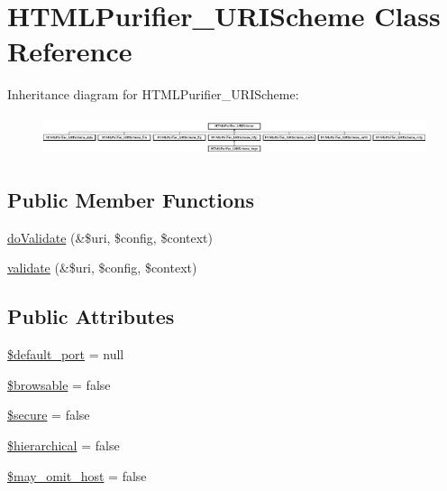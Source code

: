 \hypertarget{classHTMLPurifier__URIScheme}{\section{H\+T\+M\+L\+Purifier\+\_\+\+U\+R\+I\+Scheme Class Reference}
\label{classHTMLPurifier__URIScheme}
}
Inheritance diagram for H\+T\+M\+L\+Purifier\+\_\+\+U\+R\+I\+Scheme\+:\begin{figure}[H]
\begin{center}
\leavevmode
\includegraphics[height=1.165049cm]{classHTMLPurifier__URIScheme}
\end{center}
\end{figure}
\subsection*{Public Member Functions}
\begin{DoxyCompactItemize}
\item 
\hyperlink{classHTMLPurifier__URIScheme_ab915d9b60669d9c79c23472265ded7fd}{do\+Validate} (\&\$uri, \$config, \$context)
\item 
\hyperlink{classHTMLPurifier__URIScheme_af881ccfdd6fc02d661801e401ad3298f}{validate} (\&\$uri, \$config, \$context)
\end{DoxyCompactItemize}
\subsection*{Public Attributes}
\begin{DoxyCompactItemize}
\item 
\hyperlink{classHTMLPurifier__URIScheme_a3a6f27695d6029d4cab45ed2cc20e5ba}{\$default\+\_\+port} = null
\item 
\hyperlink{classHTMLPurifier__URIScheme_abbd36fc30d0256aa9a3a2728a4b1d28f}{\$browsable} = false
\item 
\hyperlink{classHTMLPurifier__URIScheme_a53fc8c93025cf82924f0c8f44d432e20}{\$secure} = false
\item 
\hyperlink{classHTMLPurifier__URIScheme_ac8df8407ec6f4e8c8bb1dc9ae3c352fb}{\$hierarchical} = false
\item 
\hyperlink{classHTMLPurifier__URIScheme_a9d8e36fcebf034700d00bc4d935fa765}{\$may\+\_\+omit\+\_\+host} = false
\end{DoxyCompactItemize}


